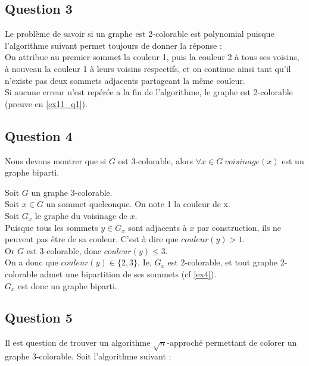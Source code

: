 \subsection{Question 3}\label{ex16_q3}
Le probl\`eme de savoir si un graphe est 2-colorable est polynomial puisque l'algorithme
suivant permet toujours de donner la r\'eponse :\\
On attribue au premier sommet la couleur 1, puis la couleur 2 \`a tous ses voisins, \`a
nouveau la couleur 1 \`a leurs voisins respectifs, et on continue ainsi tant qu'il
n'existe pas deux sommets adjacents partageant la m\^eme couleur.\\
Si aucune erreur n'est rep\'er\'ee a la fin de l'algorithme, le graphe est 2-colorable
(preuve en \ref{ex11_q1}).

\subsection{Question 4}\label{ex16_q4}
Nous devons montrer que si $G$ est 3-colorable, alors $\forall x \in G\ voisinage(x)$ est
un graphe biparti.

Soit $G$ un graphe 3-colorable.\\
Soit $x \in G$ un sommet quelconque. On note 1 la couleur de x.\\
Soit $G_x$ le graphe du voisinage de $x$.\\
Puisque tous les sommets $y \in G_x$ sont adjacents \`a $x$ par construction, ils ne
peuvent pas \^etre de sa couleur. C'est \`a dire que $couleur(y) > 1$.\\
Or $G$ est 3-colorable, donc $couleur(y) \leq 3$.\\
On a donc que $couleur(y) \in \{2,3\}$.
Ie, $G_x$ est 2-colorable, et tout graphe 2-colorable admet une bipartition de ses
sommets (cf \ref{ex4}).\\
$G_x$ est donc un graphe biparti.

\subsection{Question 5}\label{ex16_q5}
Il est question de trouver un algorithme $\sqrt{n}$-approch\'e permettant de colorer un
graphe 3-colorable.
Soit l'algorithme suivant :

